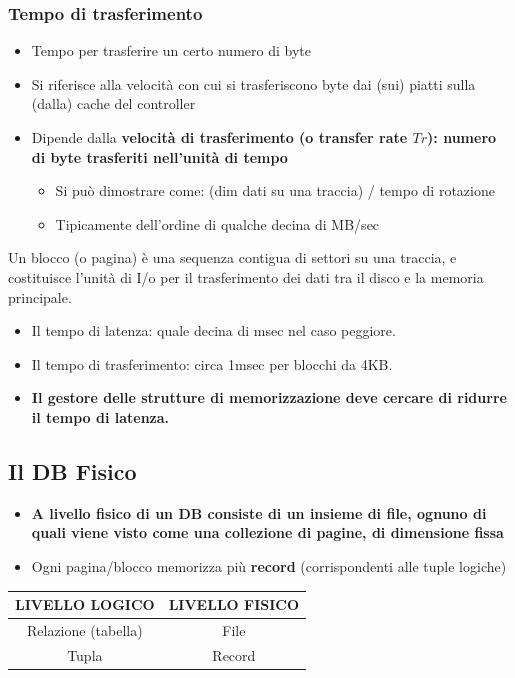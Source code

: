 \documentclass[12pt]{article}
\begin{document}
\subsubsection{Tempo di trasferimento}
\begin{itemize}
    \item Tempo per trasferire un certo numero di byte
    \item Si riferisce alla velocità con cui si trasferiscono byte dai (sui) piatti sulla (dalla) cache del controller
    \item Dipende dalla \textbf{velocità di trasferimento (o transfer rate $Tr$): numero di byte trasferiti nell'unità di tempo} \begin{itemize}
    \item Si può dimostrare come: (dim dati su una traccia) / tempo di rotazione
    \item Tipicamente dell'ordine di qualche decina di MB/sec
    \end{itemize}
\end{itemize}
Un blocco (o pagina) è una sequenza contigua di settori su una traccia, e costituisce l'unità di I/o per il trasferimento dei dati tra il disco e la memoria principale.
\begin{itemize}
    \item Il tempo di latenza: quale decina di msec nel caso peggiore.
    \item Il tempo di trasferimento: circa 1msec per blocchi da 4KB.
    \item \textbf{Il gestore delle strutture di memorizzazione deve cercare di ridurre il tempo di latenza.}
\end{itemize}
\subsection{Il DB Fisico}
\begin{itemize}
    \item \textbf{A livello fisico di un DB consiste di un insieme di file, ognuno di quali viene visto come una collezione di pagine, di dimensione fissa}
    \item Ogni pagina/blocco memorizza più \textbf{record} (corrispondenti alle tuple logiche)
\end{itemize}
\begin{center}
    \begin{tabular}{| c | c |}
        \hline
        \textbf{LIVELLO LOGICO} & \textbf{LIVELLO FISICO} \\
        \hline
        Relazione (tabella) & File \\
        \hline
        Tupla & Record \\
        \hline
    \end{tabular}
\end{center}
\end{document}
